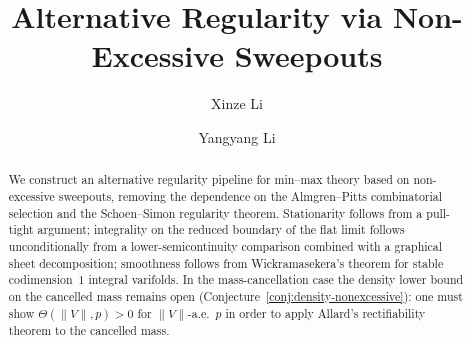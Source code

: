 \documentclass[11pt,reqno]{amsart}
\title[Alternative Regularity via Non-Excessive Sweepouts]{Alternative Regularity via Non-Excessive Sweepouts}
\author{Xinze Li}
\author{Yangyang Li}
\begin{document}
\begin{abstract}
We construct an alternative regularity pipeline for min--max theory based on
non-excessive sweepouts, removing the dependence on the Almgren--Pitts
combinatorial selection and the Schoen--Simon regularity theorem. Stationarity
follows from a pull-tight argument; integrality on the reduced boundary of the
flat limit follows unconditionally from a lower-semicontinuity comparison
combined with a graphical sheet decomposition; smoothness follows from
Wickramasekera's theorem for stable codimension~$1$ integral varifolds. In the
mass-cancellation case the density lower bound on the cancelled mass remains
open (Conjecture~\ref{conj:density-nonexcessive}): one must show
$\Theta(\|V\|, p) > 0$ for $\|V\|$-a.e.\ $p$ in order to apply Allard's
rectifiability theorem to the cancelled mass.
\end{abstract}

\maketitle








%



\end{document}

